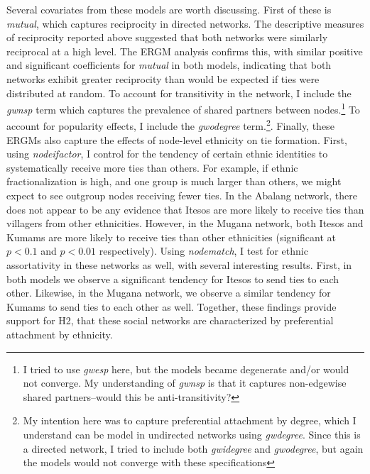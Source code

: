 \documentclass[]{article}
\let\rmarkdownfootnote\footnote%
\def\footnote{\protect\rmarkdownfootnote}
\begin{document}


Several covariates from these models are worth discussing. First of these is \textit{mutual}, which captures reciprocity in directed networks. The descriptive measures of reciprocity reported above suggested that both networks were similarly reciprocal at a high level. The ERGM analysis confirms this, with similar positive and significant coefficients for \textit{mutual} in both models, indicating that both networks exhibit greater reciprocity than would be expected if ties were distributed at random. To account for transitivity in the network, I include the \textit{gwnsp} term which captures the prevalence of shared partners between nodes.\footnote{I tried to use \textit{gwesp} here, but the models became degenerate and/or would not converge. My understanding of \textit{gwnsp} is that it captures non-edgewise shared partners--would this be anti-transitivity?}  To account for popularity effects, I include the \textit{gwodegree} term.\footnote{My intention here was to capture preferential attachment by degree, which I understand can be model in undirected networks using \textit{gwdegree}. Since this is a directed network, I tried to include both \textit{gwidegree} and \textit{gwodegree}, but again the models would not converge with these specifications}. Finally, these ERGMs also capture the effects of node-level ethnicity on tie formation. First, using \textit{nodeifactor}, I control for the tendency of certain ethnic identities to systematically receive more ties than others. For example, if ethnic fractionalization is high, and one group is much larger than others, we might expect to see outgroup nodes receiving fewer ties. In the Abalang network, there does not appear to be any evidence that Itesos are more likely to receive ties than villagers from other ethnicities. However, in the Mugana network, both Itesos and Kumams are more likely to receive ties than other ethnicities (significant at $p<0.1$ and $p<0.01$ respectively). Using \textit{nodematch}, I test for ethnic assortativity in these networks as well, with several interesting results. First, in both models we observe a significant tendency for Itesos to send ties to each other. Likewise, in the Mugana network, we observe a similar tendency for Kumams to send ties to each other as well. Together, these findings provide support for H2, that these social networks are characterized by preferential attachment by ethnicity. 

\newpage %
\end{document}
